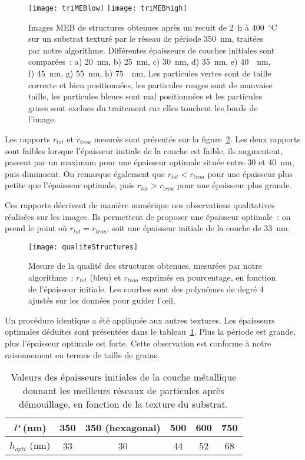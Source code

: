 \begin{figure}[!p]
\centering
\texttt{[image: triMEBlow]}
\texttt{[image: triMEBhigh]}
\caption{Images MEB de structures obtenues après un recuit de 2~h à 400~$^\circ$C sur un substrat texturé par le réseau de période 350~nm, traitées par notre algorithme. Différentes épaisseurs de couches initiales sont comparées~: a) 20~nm, b) 25~nm, c) 30~nm, d) 35~nm, e) 40~~nm, f) 45~nm, g) 55~nm, h) 75~~nm. Les particules vertes sont de taille correcte et bien positionnées, les particules rouges sont de mauvaise taille, les particules bleues sont mal positionnées et les particules grises sont exclues du traitement car elles touchent les bords de l'image.}
\label{triMEB350}
\end{figure}

Les rapports $r_{tot}$ et $r_{trou}$ mesurés sont présentés sur la figure~\ref{qualiteStructures}. Les deux rapports sont faibles lorsque l'épaisseur initiale de la couche est faible, ils augmentent, passent par un maximum pour une épaisseur \og optimale \fg{}  située entre 30 et 40~nm, puis diminuent. On remarque également que $r_{tot}<r_{trou}$ pour une épaisseur plus petite que l'épaisseur optimale, puis $r_{tot}>r_{trou}$ pour une épaisseur plus grande.\par 
Ces rapports décrivent de manière numérique nos observations qualitatives réalisées sur les images. Ils permettent de proposer une épaisseur optimale~: on prend le point où 
$r_{tot}=r_{trou}$, soit une épaisseur initiale de la couche de 33~nm.\par 
\begin{figure}[!htb]
\centering
\texttt{[image: qualiteStructures]}
\caption{Mesure de la qualité des structures obtenues, mesurées par notre algorithme~: $r_{tot}$ (bleu) et $r_{trou}$ exprimés en pourcentage, en fonction de l'épaisseur initiale. Les courbes sont des polynômes de degré 4 ajustés sur les données pour guider l'œil.}
\label{qualiteStructures}
\end{figure}

Un procédure identique a été appliquée aux autres textures. Les épaisseurs optimales déduites sont présentées dans le tableau~\ref{tOptimaux}. Plus la période est grande, plus l'épaisseur optimale est forte. Cette observation est conforme à notre raisonnement en termes de taille de grains.\par 

\begin{table}[!htb]
\centering
\begin{tabular}{cccccc}
\hline
$P$ (nm) & 350 & 350 (hexagonal) & 500 & 600 & 750 \\
\hline
$h_{opti}$ (nm)&  33 & 30 & 44 & 52 & 68\\
\hline
\end{tabular}
\caption{Valeurs des épaisseurs initiales de la couche métallique donnant les meilleurs réseaux de particules après démouillage, en fonction de la texture du substrat.}
\label{tOptimaux}
\end{table}

